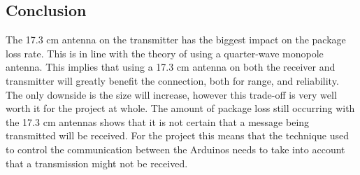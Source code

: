 \subsection{Conclusion}
The 17.3 cm antenna on the transmitter has the biggest impact on the package loss rate.
This is in line with the theory of using a quarter-wave monopole antenna.
This implies that using a 17.3 cm antenna on both the receiver and transmitter will greatly benefit the connection, both for range, and reliability.
The only downside is the size will increase, however this trade-off is very well worth it for the project at whole.
The amount of package loss still occurring with the 17.3 cm antennas shows that it is not certain that a message being transmitted will be received.
For the project this means that the technique used to control the communication between the Arduinos needs to take into account that a transmission might not be received.
